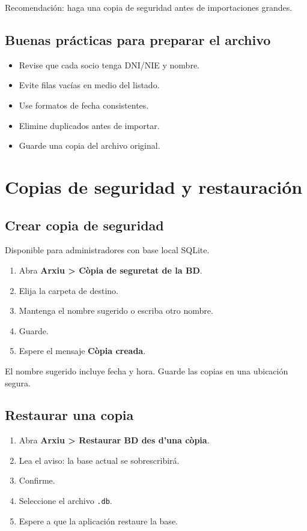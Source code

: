 \documentclass[12pt]{article}
\newcommand{\menu}[1]{\textbf{#1}}
\begin{document}
Recomendación: haga una copia de seguridad antes de importaciones grandes.

\subsection{Buenas prácticas para preparar el archivo}
\begin{itemize}
  \item Revise que cada socio tenga DNI/NIE y nombre.
  \item Evite filas vacías en medio del listado.
  \item Use formatos de fecha consistentes.
  \item Elimine duplicados antes de importar.
  \item Guarde una copia del archivo original.
\end{itemize}

\section{Copias de seguridad y restauración}
\subsection{Crear copia de seguridad}
Disponible para administradores con base local SQLite.

\begin{enumerate}
  \item Abra \menu{Arxiu > Còpia de seguretat de la BD}.
  \item Elija la carpeta de destino.
  \item Mantenga el nombre sugerido o escriba otro nombre.
  \item Guarde.
  \item Espere el mensaje \menu{Còpia creada}.
\end{enumerate}

El nombre sugerido incluye fecha y hora. Guarde las copias en una ubicación segura.

\subsection{Restaurar una copia}
\begin{enumerate}
  \item Abra \menu{Arxiu > Restaurar BD des d'una còpia}.
  \item Lea el aviso: la base actual se sobrescribirá.
  \item Confirme.
  \item Seleccione el archivo \texttt{.db}.
  \item Espere a que la aplicación restaure la base.
\end{enumerate}
\end{document}
